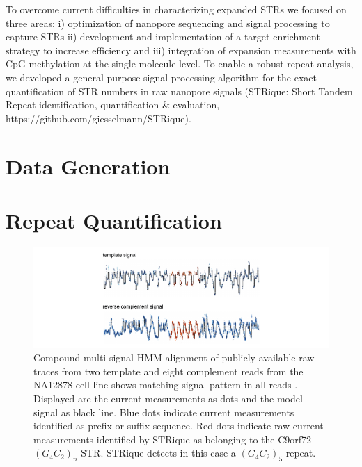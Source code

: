 To overcome current difficulties in characterizing expanded STRs we focused on three areas: i) optimization of nanopore sequencing and signal processing to capture STRs ii) development and implementation of a target enrichment strategy to increase efficiency and iii) integration of expansion measurements with CpG methylation at the single molecule level.
To enable a robust repeat analysis, we developed a general-purpose signal processing algorithm for the exact quantification of STR numbers in raw nanopore signals (STRique: Short Tandem Repeat identification, quantification \& evaluation, https://github.com/giesselmann/STRique). 


\section{Data Generation}
\label{sec:strique:data}



\section{Repeat Quantification}
\label{sec:strique:quantification}

\begin{figure}[h]
    \centering
    \includegraphics[width=1.0\textwidth]{figures/strique/signal.pdf}
    \captionsetup{format=plain}
    \caption[Nanopore raw signal of the C9orf72 STR in NA12878 cells]{Compound multi signal HMM alignment of publicly available raw traces from two template and eight complement reads from the NA12878 cell line shows matching signal pattern in all reads \cite{Jain2018}. Displayed are the current measurements as dots and the model signal as black line. Blue dots indicate current measurements identified as prefix or suffix sequence. Red dots indicate raw current measurements identified by STRique as belonging to the C9orf72-$ (G_{4}C_{2})_{n} $-STR. STRique detects in this case a $ (G_{4}C_{2})_{5} $-repeat.}
    \label{fig:strique:signal}
\end{figure}


